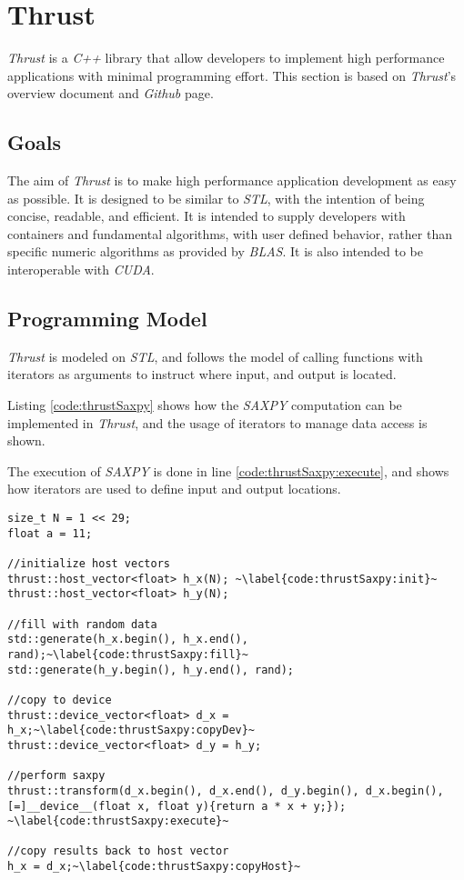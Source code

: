 \section{Thrust} \label{cha:thrustRelWork}
\textit{Thrust} is a \textit{C++} library that allow developers to implement high performance applications with minimal programming effort. This section is based on \textit{Thrust}'s overview document\cite{thrustOverview} and \textit{Github} page\cite{thrustGithub}.

\subsection{Goals}
The aim of \textit{Thrust} is to make high performance application development as easy as possible. It is designed to be similar to \textit{STL}, with the intention of being concise, readable, and efficient. It is intended to supply developers with containers and fundamental algorithms, with user defined behavior, rather than specific numeric algorithms as provided by \textit{BLAS}. It is also intended to be interoperable with \textit{CUDA}.

\subsection{Programming Model}
\textit{Thrust} is modeled on \textit{STL}, and follows the model of calling functions with iterators as arguments to instruct where input, and output is located.

Listing \ref{code:thrustSaxpy} shows how the \textit{SAXPY} computation can be implemented in \textit{Thrust}, and the usage of iterators to manage data access is shown.

The execution of \textit{SAXPY} is done in line \ref{code:thrustSaxpy:execute}, and shows how iterators are used to define input and output locations.
\begin{lstlisting}[caption={\textit{Thrust} \textit{SAXPY} example.}, label={code:thrustSaxpy}]
size_t N = 1 << 29;
float a = 11;

//initialize host vectors
thrust::host_vector<float> h_x(N); ~\label{code:thrustSaxpy:init}~
thrust::host_vector<float> h_y(N);

//fill with random data
std::generate(h_x.begin(), h_x.end(), rand);~\label{code:thrustSaxpy:fill}~
std::generate(h_y.begin(), h_y.end(), rand);

//copy to device
thrust::device_vector<float> d_x = h_x;~\label{code:thrustSaxpy:copyDev}~
thrust::device_vector<float> d_y = h_y;

//perform saxpy
thrust::transform(d_x.begin(), d_x.end(), d_y.begin(), d_x.begin(), [=]__device__(float x, float y){return a * x + y;}); ~\label{code:thrustSaxpy:execute}~

//copy results back to host vector
h_x = d_x;~\label{code:thrustSaxpy:copyHost}~
\end{lstlisting}


